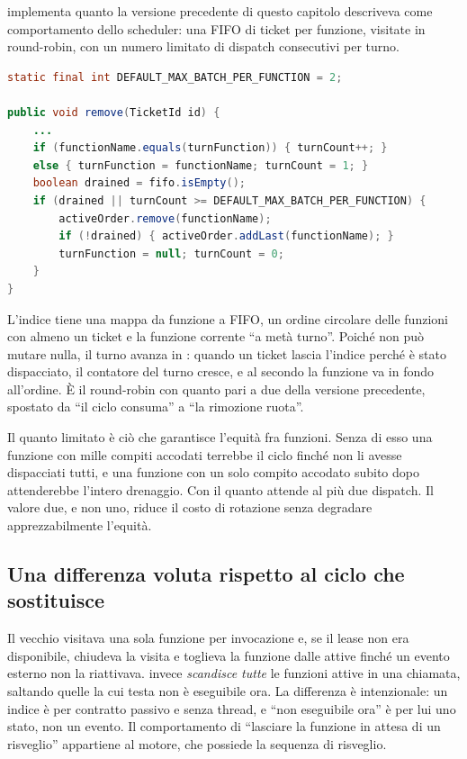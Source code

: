  implementa quanto la versione precedente di
questo capitolo descriveva come comportamento dello scheduler: una FIFO di ticket
per funzione, visitate in round-robin, con un numero limitato di dispatch
consecutivi per turno.

\begin{lstlisting}[language=Java]
static final int DEFAULT_MAX_BATCH_PER_FUNCTION = 2;

public void remove(TicketId id) {
    ...
    if (functionName.equals(turnFunction)) { turnCount++; }
    else { turnFunction = functionName; turnCount = 1; }
    boolean drained = fifo.isEmpty();
    if (drained || turnCount >= DEFAULT_MAX_BATCH_PER_FUNCTION) {
        activeOrder.remove(functionName);
        if (!drained) { activeOrder.addLast(functionName); }
        turnFunction = null; turnCount = 0;
    }
}
\end{lstlisting}

L'indice tiene una mappa da funzione a FIFO, un ordine circolare delle funzioni
con almeno un ticket e la funzione corrente ``a met\`a turno''. Poich\'e
 non pu\`o mutare nulla, il turno avanza in : quando un
ticket lascia l'indice perch\'e \`e stato dispacciato, il contatore del turno cresce,
e al secondo la funzione va in fondo all'ordine. \`E il round-robin con quanto pari a
due della versione precedente, spostato da ``il ciclo consuma'' a ``la rimozione
ruota''.

Il quanto limitato \`e ci\`o che garantisce l'equit\`a fra funzioni. Senza di esso una
funzione con mille compiti accodati terrebbe il ciclo finch\'e non li avesse
dispacciati tutti, e una funzione con un solo compito accodato subito dopo attenderebbe
l'intero drenaggio. Con il quanto attende al pi\`u due dispatch. Il valore due, e non
uno, riduce il costo di rotazione senza degradare apprezzabilmente l'equit\`a.

\subsection{Una differenza voluta rispetto al ciclo che sostituisce}

Il vecchio  visitava una sola funzione per invocazione e, se il
lease non era disponibile, chiudeva la visita e toglieva la funzione dalle attive
finch\'e un evento esterno non la riattivava.  invece \emph{scandisce
tutte} le funzioni attive in una chiamata, saltando quelle la cui testa non \`e
eseguibile ora. La differenza \`e intenzionale: un indice \`e per contratto passivo e
senza thread, e ``non eseguibile ora'' \`e per lui uno stato, non un evento. Il
comportamento di ``lasciare la funzione in attesa di un risveglio'' appartiene al
motore, che possiede la sequenza di risveglio.


